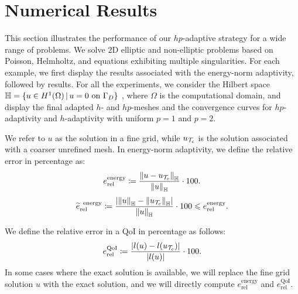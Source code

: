 \section{Numerical Results}
\label{sec:Numerical}
This section illustrates the performance of our $hp$-adaptive strategy for a wide range of problems. We solve $2$D elliptic and non-elliptic problems based on Poisson, Helmholtz, and  equations exhibiting multiple singularities.  For each example, we first display the results associated with the energy-norm adaptivity, followed by  results. For all the experiments, we consider the Hilbert space $\mathbb{H} = \{u \in H^{1}(\Omega)  \, | \, u = 0 \text{ on } {\Gamma_{D}} \}$ , where $\Omega$ is the computational domain, and display the final adapted $h$- and $hp$-meshes and the convergence curves for $hp$-adaptivity and $h$-adaptivity with uniform $p=1$ and $p=2$. 

We refer to $u$ as the solution in a fine grid, while $u_{\mathcal{T}_{c}}$ is the solution associated with a coarser unrefined mesh. In energy-norm adaptivity, we define the relative error in percentage as:
\begin{equation}
  e_{\textrm{rel}}^{\textrm{energy}} \coloneqq  \frac{\left\|u - u_{\mathcal{T}_{c}}\right\|_{\mathbb{H}}}{\left\|u\right\|_{\mathbb{H}}} \cdot 100.
  \label{eq:relerror}
\end{equation}
\noindent {}
\begin{equation}
  \widetilde{e}_{\textrm{rel}}^{\textrm{\, energy}} \coloneqq \frac{\left|\left\|u\right\|_{\mathbb{H}} - \left\|u_{\mathcal{T}_{c}}\right\|_{\mathbb{H}}\right|}{\left\|u\right\|_{\mathbb{H}}} \cdot 100 \leqslant e_{\textrm{rel}}^{\textrm{energy}}.
  \label{eq:lowrelerror}
\end{equation}

We define the relative error in a QoI in percentage as follows:
\begin{equation}
  e_{\textrm{rel}}^{\textrm{QoI}} \coloneqq \frac{\left|l(u) - l(u_{\mathcal{T}_{c}})\right|}{\left|l(u)\right|} \cdot 100.
  \label{eq:relerrorqoi}
\end{equation}
\noindent In some cases where the exact solution is available, we will replace the fine grid solution $u$ with the exact solution, and we will directly compute $e_{\textrm{rel}}^{\textrm{energy}}$ and $e_{\textrm{rel}}^{\textrm{QoI}}$.

